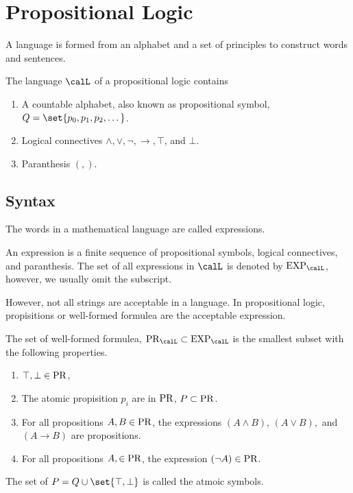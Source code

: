 \chapter{Propositional Logic}

A language is formed from an alphabet and a set of principles to construct words and sentences.

\begin{definition}
    The language \(\calL\) of a propositional logic contains
    \begin{enumerate}
        \item A countable alphabet, also known as propositional symbol, \(Q = \set{p_0, p_1, p_2,\dots}\).
        \item Logical connectives \(\land, \lor, \neg, \to,\top\), and \(\bot\).
        \item Paranthesis \((,)\).
    \end{enumerate}
\end{definition}
\section{Syntax}
The words in a mathematical language are called expressions.

\begin{definition}
    An expression is a finite sequence of propositional symbols, logical connectives, and paranthesis. The set of all expressions in \(\calL\) is denoted by \(\LEXP_{\calL}\), however, we usually omit the subscript.
\end{definition}

However, not all strings are acceptable in a language. In propositional logic, propisitions or well-formed formulea are the acceptable expression.

\begin{definition}
    The set of well-formed formulea, \(\LPR_{\calL} \subset \LEXP_{\calL}\) is the smallest subset with the following properties.
    \begin{enumerate}
        \item \(\top,\bot \in \operatorname{PR}\),
        \item The atomic propisition \(p_i\) are in \(\operatorname{PR}\), \(P \subset \operatorname{PR}\).
        \item For all propositions \(A,B \in \operatorname{PR}\), the expressions \((A \land B)\), \((A \lor B),\) and \((A \to B)\) are propositions.
        \item For all propositions \(A, \in \operatorname{PR}\), the expression \((\neg A) \in \operatorname{PR}\).
    \end{enumerate}
\end{definition}
The set of \(P = Q \cup \set{\top,\bot}\) is called the atmoic symbols.

